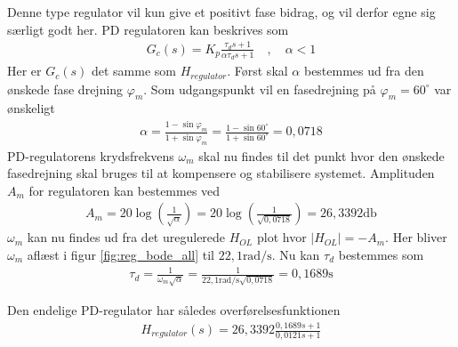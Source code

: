 Denne type regulator vil kun give et positivt fase bidrag, og vil derfor egne sig særligt godt her.
PD regulatoren kan beskrives som \cite[s.276, (6.7)]{Reg2015}
\begin{align}
G_c(s) = K_p \frac{\tau_d s + 1}{\alpha \tau_d s + 1} \quad, \quad \alpha < 1  \label{eq:reg_gc}
\end{align}	
Her er $G_c(s)$ det samme som $H_{regulator}$. 
Først skal $\alpha$ bestemmes ud fra den ønskede fase drejning $\varphi_m$. Som udgangspunkt vil en fasedrejning på $\varphi_m = 60^{\circ}$ var ønskeligt \cite[s. 278]{Reg2015}
\begin{align}
\alpha = \frac{1 - \sin{\varphi_m}}{1 + \sin{\varphi_m}} = \frac{1 - \sin{60^{\circ}}}{1 + \sin{60^{\circ}}} = 0,0718
\end{align}
PD-regulatorens krydsfrekvens $\omega_m$ skal nu findes til det punkt hvor den ønskede fasedrejning skal bruges til at kompensere og stabilisere systemet.
Amplituden $A_m$ for regulatoren kan bestemmes ved \cite[s. 277, fig. 6.21]{Reg2015}
\begin{align}
A_m = 20 \log \left(\frac{1}{\sqrt{\alpha}}\right) =  20 \log \left(\frac{1}{\sqrt{0,0718}}\right) = 26,3392 \si{\decibel}
\end{align}
$\omega_m$ kan nu findes ud fra det uregulerede $H_{OL}$ plot hvor $|H_{OL}| = -A_m$.
Her bliver $\omega_m$ aflæst i figur \ref{fig:reg_bode_all} til $22,1 \si{\radian\per\second}$. 
Nu kan $\tau_d$ bestemmes som \cite[s. 279, (6.13)]{Reg2015}
\begin{align}
\tau_d = \frac{1}{\omega_m\sqrt{\alpha}} = \frac{1}{22,1 \si{\radian\per\second}\sqrt{0,0718}} = 0,1689 \si{\second}
\end{align}

Den endelige PD-regulator har således overførelsesfunktionen
\begin{align}
H_{regulator}(s) = 26,3392 \frac{0,1689 s + 1}{0,0121 s + 1}  \label{eq:reg_pd_final}
\end{align}	



